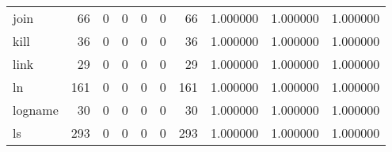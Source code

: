 \begin{longtable}{lrrrrrrrrr}
join      &                                        66 &                                                  0 &                                                  0 &                                                  0 &                                                  0 &                                                 66 &                                           1.000000 &                               1.000000 &                             1.000000 \\
kill      &                                        36 &                                                  0 &                                                  0 &                                                  0 &                                                  0 &                                                 36 &                                           1.000000 &                               1.000000 &                             1.000000 \\
link      &                                        29 &                                                  0 &                                                  0 &                                                  0 &                                                  0 &                                                 29 &                                           1.000000 &                               1.000000 &                             1.000000 \\
ln        &                                       161 &                                                  0 &                                                  0 &                                                  0 &                                                  0 &                                                161 &                                           1.000000 &                               1.000000 &                             1.000000 \\
logname   &                                        30 &                                                  0 &                                                  0 &                                                  0 &                                                  0 &                                                 30 &                                           1.000000 &                               1.000000 &                             1.000000 \\
ls        &                                       293 &                                                  0 &                                                  0 &                                                  0 &                                                  0 &                                                293 &                                           1.000000 &                               1.000000 &                             1.000000 \\

\end{longtable}
